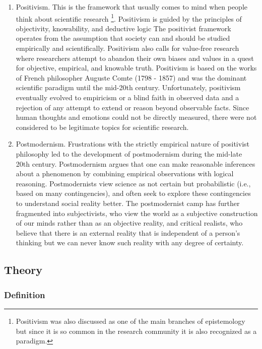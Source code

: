 \documentclass[]{book}
\let\rmarkdownfootnote\footnote%
\def\footnote{\protect\rmarkdownfootnote}
\theoremstyle{definition}
\theoremstyle{definition}
\theoremstyle{definition}
\theoremstyle{remark}
\begin{document}
\begin{enumerate}
\def\labelenumi{\arabic{enumi}.}
\item
  Positivism. This is the framework that usually comes to mind when
  people think about scientific research \footnote{Positivism was also
    discussed as one of the main branches of epistemology but since it
    is so common in the research community it is also recognized as a
    paradigm.}. Positivism is guided by the principles of objectivity,
  knowability, and deductive logic The positivist framework operates
  from the assumption that society can and should be studied empirically
  and scientifically. Positivism also calls for value-free research
  where researchers attempt to abandon their own biases and values in a
  quest for objective, empirical, and knowable truth. Positivism is
  based on the works of French philosopher Auguste Comte (1798 - 1857)
  and was the dominant scientific paradigm until the mid-20th century.
  Unfortunately, positivism eventually evolved to empiricism or a blind
  faith in observed data and a rejection of any attempt to extend or
  reason beyond observable facts. Since human thoughts and emotions
  could not be directly measured, there were not considered to be
  legitimate topics for scientific research.
\item
  Postmodernism. Frustrations with the strictly empirical nature of
  positivist philosophy led to the development of postmodernism during
  the mid-late 20th century. Postmodernism argues that one can make
  reasonable inferences about a phenomenon by combining empirical
  observations with logical reasoning. Postmodernists view science as
  not certain but probabilistic (i.e., based on many contingencies), and
  often seek to explore these contingencies to understand social reality
  better. The postmodernist camp has further fragmented into
  subjectivists, who view the world as a subjective construction of our
  minds rather than as an objective reality, and critical realists, who
  believe that there is an external reality that is independent of a
  person's thinking but we can never know such reality with any degree
  of certainty.
\end{enumerate}

\hypertarget{theory}{%
\subsection{Theory}\label{theory}}

\hypertarget{definition}{%
\subsubsection{Definition}\label{definition}}
\end{document}
